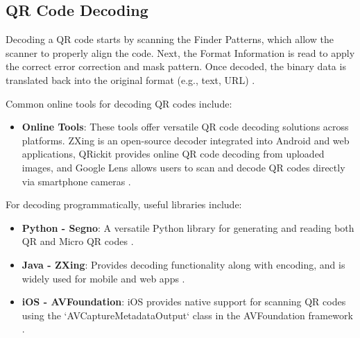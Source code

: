\subsection{QR Code Decoding}  
Decoding a QR code starts by scanning the Finder Patterns, which allow the scanner to properly align the code. Next, the Format Information is read to apply the correct error correction and mask pattern. Once decoded, the binary data is translated back into the original format (e.g., text, URL) \cite{Tiwari2016}.

Common online tools for decoding QR codes include:
\begin{itemize}
	\item \textbf{Online Tools}: These tools offer versatile QR code decoding solutions across platforms. ZXing is an open-source decoder integrated into Android and web applications, QRickit provides online QR code decoding from uploaded images, and Google Lens allows users to scan and decode QR codes directly via smartphone cameras \cite{ZXing2024, QRickit2024}.
	
\end{itemize}

For decoding programmatically, useful libraries include:
\begin{itemize}
	\item \textbf{Python - Segno}: A versatile Python library for generating and reading both QR and Micro QR codes \cite{Segno2024}.
	\item \textbf{Java - ZXing}: Provides decoding functionality along with encoding, and is widely used for mobile and web apps \cite{ZXing2024}.
	\item \textbf{iOS - AVFoundation}: iOS provides native support for scanning QR codes using the `AVCaptureMetadataOutput` class in the AVFoundation framework \cite{AVFoundation2024}.
\end{itemize}


